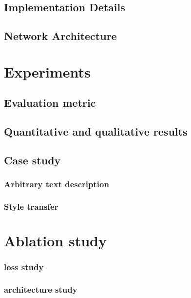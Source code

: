 \documentclass[10pt,twocolumn,letterpaper]{article}
\begin{document}
\subsection{Implementation Details}

\subsection{Network Architecture}

\section{Experiments}
\subsection{Evaluation metric}
\subsection{Quantitative and qualitative results}

\subsection{Case study}
\subsubsection{Arbitrary text description}
\subsubsection{Style transfer}

\section{Ablation study}
\subsubsection{loss study}
\subsubsection{architecture study}



{\small


}
\end{document}
